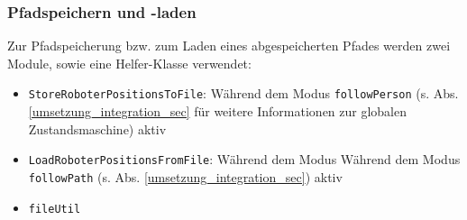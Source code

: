 

\subsubsection{Pfadspeichern und -laden}
\label{bahnplanung_pfadSpeichernLaden_subsubsec}


Zur Pfadspeicherung bzw. zum Laden eines abgespeicherten Pfades werden zwei Module, sowie eine Helfer-Klasse verwendet:
\begin{itemize}
	\item \lstinline{StoreRoboterPositionsToFile}: Während dem Modus \lstinline{followPerson} (s. Abs. \ref{umsetzung_integration_sec} für weitere Informationen zur globalen Zustandsmaschine) aktiv
	\item \lstinline{LoadRoboterPositionsFromFile}: Während dem Modus Während dem Modus \lstinline{followPath} (s. Abs. \ref{umsetzung_integration_sec}) aktiv
	\item \lstinline{fileUtil}
\end{itemize}

